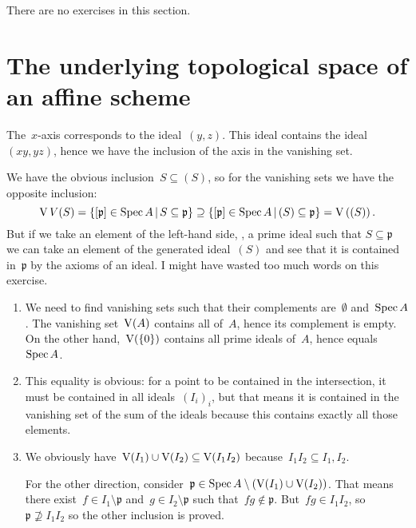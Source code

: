 There are no exercises in this section.


\section{The underlying topological space of an affine scheme}

\begin{exercise}
  The~$x$\nobreakdash-axis corresponds to the ideal~$(y,z)$. This ideal contains the ideal~$(xy,yz)$, hence we have the inclusion of the axis in the vanishing set.
\end{exercise}

\begin{exercise}
  We have the obvious inclusion~$S\subseteq(S)$, so for the vanishing sets we have the opposite inclusion:
  \begin{equation}
    \operatorname{V}{V}(S)=\left\{ [\mathfrak{p}]\in\operatorname{Spec} A\,|\, S\subseteq\mathfrak{p} \right\}\supseteq\left\{ [\mathfrak{p}]\in\operatorname{Spec} A\,|\, (S)\subseteq\mathfrak{p} \right\}=\operatorname{V}\left( (S) \right).
  \end{equation}
  But if we take an element of the left-hand side, \ie, a prime ideal such that $S\subseteq\mathfrak{p}$ we can take an element of the generated ideal~$(S)$ and see that it is contained in~$\mathfrak{p}$ by the axioms of an ideal. I might have wasted too much words on this exercise.
\end{exercise}

\begin{exercise}
  \label{exercise:44c}
  \begin{enumerate}
    \item\label{enumerate:44c-a} We need to find vanishing sets such that their complements are~$\emptyset$ and~$\operatorname{Spec} A$. The vanishing set~$\operatorname{V}(A)$ contains all of~$A$, hence its complement is empty. On the other hand,~$\operatorname{V}(\left\{ 0 \right\})$ contains all prime ideals of~$A$, hence equals~$\operatorname{Spec} A$.

    \item This equality is obvious: for a point to be contained in the intersection, it must be contained in all ideals~$(I_i)_i$, but that means it is contained in the vanishing set of the sum of the ideals because this contains exactly all those elements.

    \item We obviously have~$\operatorname{V}(I_1)\cup\operatorname{V}(I_2)\subseteq\operatorname{V}(I_1I_2)$ because~$I_1I_2\subseteq I_1,I_2$.

      For the other direction, consider~$\mathfrak{p}\in\operatorname{Spec} A\setminus(\operatorname{V}(I_1)\cup\operatorname{V}(I_2))$. That means there exist~$f\in I_1\setminus\mathfrak{p}$ and~$g\in I_2\setminus\mathfrak{p}$ such that~$fg\notin\mathfrak{p}$. But~$fg\in I_1I_2$, so~$\mathfrak{p}\nsupseteq I_1I_2$ so the other inclusion is proved.
  \end{enumerate}
\end{exercise}


